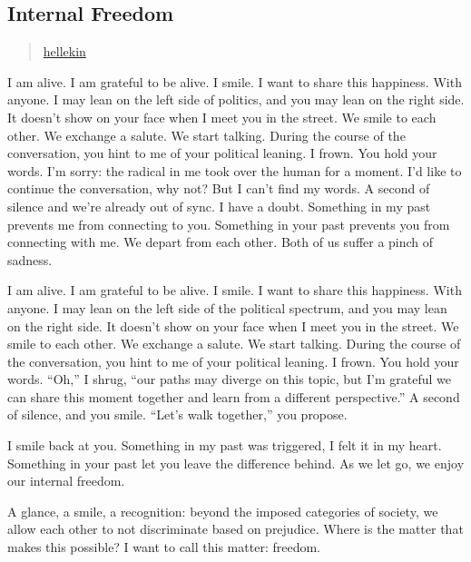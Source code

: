 \subsection{Internal Freedom}\label{internal-freedom}

\begin{quote}
\href{../appendix/attributions.html\#hellekin}{hellekin}
\end{quote}

I am alive. I am grateful to be alive. I smile. I want to share this
happiness. With anyone. I may lean on the left side of politics, and you
may lean on the right side. It doesn't show on your face when I meet you
in the street. We smile to each other. We exchange a salute. We start
talking. During the course of the conversation, you hint to me of your
political leaning. I frown. You hold your words. I'm sorry: the radical
in me took over the human for a moment. I'd like to continue the
conversation, why not? But I can't find my words. A second of silence
and we're already out of sync. I have a doubt. Something in my past
prevents me from connecting to you. Something in your past prevents you
from connecting with me. We depart from each other. Both of us suffer a
pinch of sadness.

I am alive. I am grateful to be alive. I smile. I want to share this
happiness. With anyone. I may lean on the left side of the political
spectrum, and you may lean on the right side. It doesn't show on your
face when I meet you in the street. We smile to each other. We exchange
a salute. We start talking. During the course of the conversation, you
hint to me of your political leaning. I frown. You hold your words.
``Oh,'' I shrug, ``our paths may diverge on this topic, but I'm grateful
we can share this moment together and learn from a different
perspective.'' A second of silence, and you smile. ``Let's walk
together,'' you propose.

I smile back at you. Something in my past was triggered, I felt it in my
heart. Something in your past let you leave the difference behind. As we
let go, we enjoy our internal freedom.

A glance, a smile, a recognition: beyond the imposed categories of
society, we allow each other to not discriminate based on prejudice.
Where is the matter that makes this possible? I want to call this
matter: freedom.

